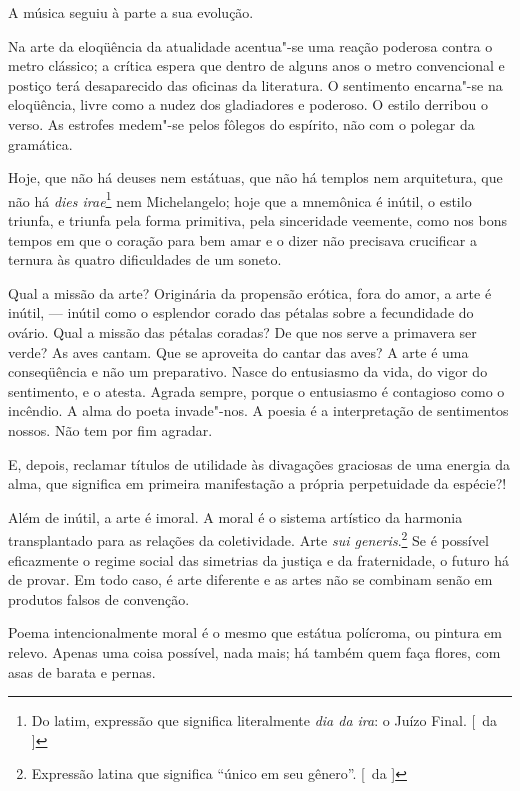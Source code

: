 A música seguiu à parte a sua evolução. 

Na arte da eloqüência da atualidade acentua"-se uma reação poderosa contra o
metro clássico; a crítica espera que dentro de alguns anos o metro
convencional e postiço terá desaparecido das oficinas da literatura. O
sentimento encarna"-se na eloqüência, livre como a nudez dos
gladiadores e poderoso. O estilo derribou o verso. As estrofes
medem"-se pelos fôlegos do espírito, não com o polegar da gramática.

Hoje, que não há deuses nem estátuas, que não há templos nem
arquitetura, que não há \textit{dies irae}\footnote{ Do latim, expressão que 
significa literalmente \textit{dia da ira}: o Juízo Final. [~da ]} 
nem Michelangelo; hoje que a
mnemônica é inútil, o estilo triunfa, e triunfa pela forma primitiva,
pela sinceridade veemente, como nos bons tempos em que o coração para
bem amar e o dizer não precisava crucificar a ternura às quatro
dificuldades de um soneto. 

Qual a missão da arte? Originária da
propensão erótica, fora do amor, a arte é inútil, --- inútil como o
esplendor corado das pétalas sobre a fecundidade do ovário. Qual a
missão das pétalas coradas? De que nos serve a primavera ser verde? As
aves cantam. Que se aproveita do cantar das aves? A arte é uma
conseqüência e não um preparativo. Nasce do entusiasmo da vida, do
vigor do sentimento, e o atesta. Agrada sempre, porque o entusiasmo é
contagioso como o incêndio. A alma do poeta invade"-nos. 
A poesia é a interpretação de sentimentos nossos. Não tem por fim
agradar. 

E, depois, reclamar títulos de utilidade às divagações
graciosas de uma energia da alma, que significa em primeira
manifestação a própria perpetuidade da espécie?! 

Além de inútil, a arte
é imoral. A moral é o sistema artístico da harmonia transplantado para
as relações da coletividade. Arte \textit{sui generis}.\footnote{ Expressão latina 
que significa ``único em seu gênero''. [~da ]} Se é possível
eficazmente o regime social das simetrias da justiça e da fraternidade,
o futuro há de provar. Em todo caso, é arte diferente e as artes não se
combinam senão em produtos falsos de convenção. 

Poema intencionalmente
moral é o mesmo que estátua polícroma, ou pintura em relevo. Apenas uma
coisa possível, nada mais; há também quem faça flores, com asas de
barata e pernas. 

